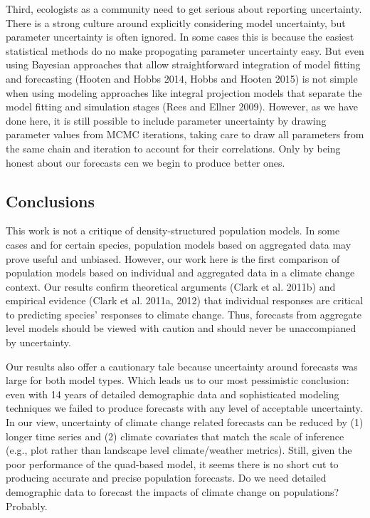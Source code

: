 \documentclass[12pt,]{article}
\begin{document}
Third, ecologists as a community need to get serious about reporting
uncertainty. There is a strong culture around explicitly considering
model uncertainty, but parameter uncertainty is often ignored. In some
cases this is because the easiest statistical methods do no make
propogating parameter uncertainty easy. But even using Bayesian
approaches that allow straightforward integration of model fitting and
forecasting (Hooten and Hobbs 2014, Hobbs and Hooten 2015) is not simple
when using modeling approaches like integral projection models that
separate the model fitting and simulation stages (Rees and Ellner 2009).
However, as we have done here, it is still possible to include parameter
uncertainty by drawing parameter values from MCMC iterations, taking
care to draw all parameters from the same chain and iteration to account
for their correlations. Only by being honest about our forecasts cen we
begin to produce better ones.

\subsection{Conclusions}\label{conclusions}

This work is not a critique of density-structured population models. In
some cases and for certain species, population models based on
aggregated data may prove useful and unbiased. However, our work here is
the first comparison of population models based on individual and
aggregated data in a climate change context. Our results confirm
theoretical arguments (Clark et al. 2011b) and empirical evidence (Clark
et al. 2011a, 2012) that individual responses are critical to predicting
species' responses to climate change. Thus, forecasts from aggregate
level models should be viewed with caution and should never be
unaccompianed by uncertainty.

Our results also offer a cautionary tale because uncertainty around
forecasts was large for both model types. Which leads us to our most
pessimistic conclusion: even with 14 years of detailed demographic data
and sophisticated modeling techniques we failed to produce forecasts
with any level of acceptable uncertainty. In our view, uncertainty of
climate change related forecasts can be reduced by (1) longer time
series and (2) climate covariates that match the scale of inference
(e.g., plot rather than landscape level climate/weather metrics). Still,
given the poor performance of the quad-based model, it seems there is no
short cut to producing accurate and precise population forecasts. Do we
need detailed demographic data to forecast the impacts of climate change
on populations? Probably.
\end{document}
